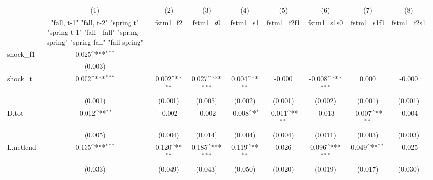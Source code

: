 {
\def\sym#1{\ifmmode^{#1}\else\(^{#1}\)\fi}
\begin{tabular}{l*{8}{c}}
\toprule
            &\multicolumn{1}{c}{(1)}&\multicolumn{1}{c}{(2)}&\multicolumn{1}{c}{(3)}&\multicolumn{1}{c}{(4)}&\multicolumn{1}{c}{(5)}&\multicolumn{1}{c}{(6)}&\multicolumn{1}{c}{(7)}&\multicolumn{1}{c}{(8)}\\
            &\multicolumn{1}{c}{  "fall, t-1" "fall, t-2" "spring t" "spring t-1"  "fall - fall" "spring - spring" "spring-fall" "fall-spring" }&\multicolumn{1}{c}{fstm1\_f2}&\multicolumn{1}{c}{fstm1\_s0}&\multicolumn{1}{c}{fstm1\_s1}&\multicolumn{1}{c}{fstm1\_f2f1}&\multicolumn{1}{c}{fstm1\_s1s0}&\multicolumn{1}{c}{fstm1\_s1f1}&\multicolumn{1}{c}{fstm1\_f2s1}\\
\midrule
shock\_f1    &       0.025\sym{***}&                     &                     &                     &                     &                     &                     &                     \\
            &     (0.003)         &                     &                     &                     &                     &                     &                     &                     \\
\addlinespace
shock\_t     &       0.002\sym{***}&       0.002\sym{**} &       0.027\sym{***}&       0.004\sym{**} &      -0.000         &      -0.008\sym{***}&       0.000         &      -0.000         \\
            &     (0.001)         &     (0.001)         &     (0.005)         &     (0.002)         &     (0.001)         &     (0.002)         &     (0.001)         &     (0.001)         \\
\addlinespace
D.tot       &      -0.012\sym{**} &      -0.002         &      -0.002         &      -0.008\sym{*}  &      -0.011\sym{**} &      -0.013         &      -0.007\sym{**} &      -0.004         \\
            &     (0.005)         &     (0.004)         &     (0.014)         &     (0.004)         &     (0.004)         &     (0.011)         &     (0.003)         &     (0.003)         \\
\addlinespace
L.netlend   &       0.135\sym{***}&       0.120\sym{**} &       0.185\sym{***}&       0.119\sym{**} &       0.026         &       0.096\sym{***}&       0.049\sym{**} &      -0.025         \\
            &     (0.033)         &     (0.049)         &     (0.043)         &     (0.050)         &     (0.020)         &     (0.019)         &     (0.017)         &     (0.030)         \\

\end{tabular}}
